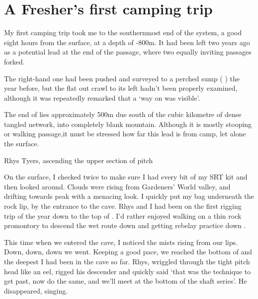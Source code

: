 \section{A Fresher's first camping trip}


My first camping trip took me to the southernmost end of the system, a good eight hours from the surface, at a depth of -800m. It had been left two years ago as a potential lead at the end of the  passage, where two equally inviting passages forked. 

\label{sec:helmsdeep}

The right-hand one had been pushed and surveyed to a perched sump (  ) the year before, but the flat out crawl to its left hadn't been properly examined, although it was repeatedly remarked that a `way on was visible'. 

The end of  lies approximately 500m due south of the cubic kilometre of dense tangled network, into completely blank mountain. Although it is mostly stooping or walking passage,it must be stressed how far this lead is from camp, let alone the surface.


\begin{marginfigure}
\checkoddpage \ifoddpage \forcerectofloat \else \forceversofloat \fi
\centering
 \caption{Rhys Tyers, ascending the upper section of \protect{} pitch }
 \label{Laurel-up}
\end{marginfigure}

On the surface, I checked twice to make sure I had every bit of my SRT kit and then looked around. Clouds were rising from Gardeners' World valley, and drifting towards  peak with a menacing look. I quickly put my bag underneath the rock lip, by the entrance to the cave. Rhys and I had been on the first rigging trip of the year down to the top of . I'd rather enjoyed walking on a thin rock promontory to descend the wet route down  and getting rebelay practice down .

This time when we entered the cave, I noticed the mists rising from our lips. Down, down, down we went. Keeping a good pace, we reached the bottom of  and the deepest I had been in the cave so far. Rhys, wriggled through the tight  pitch head like an eel, rigged his descender and quickly said `that was the technique to get past, now do the same, and we'll meet at the bottom of the shaft series'. He disappeared, singing.

